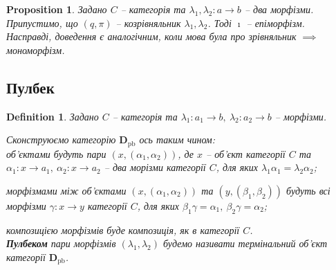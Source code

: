 \documentclass[a4paper, 10pt]{article}
\theoremstyle{theoremdd}
\newtheorem{definition}[theorem]{Definition}
\newtheorem{proposition}[theorem]{Proposition}
\begin{document}

\begin{proposition}
Задано $C$ -- категорія та $\lambda_1, \lambda_2 \colon a \to b$ -- два морфізми. Припустимо, що $(q,\pi)$ -- козрівняльник $\lambda_1,\lambda_2$. Тоді $\imath$ -- епіморфізм.\\
\textit{Насправді, доведення є аналогічним, коли мова була про зрівняльник $\implies$ мономорфізм.}
\end{proposition}

\subsection{Пулбек}
\begin{definition}
Задано $C$ -- категорія та $\lambda_1 \colon a_1 \to b,\ \lambda_2 \colon a_2 \to b$ -- морфізми.
\begin{figure}[H]
\centering
{}
\end{figure}
\noindent
Сконструюємо категорію $\textbf{D}_{\text{pb}}$ ось таким чином:\\
об'єктами будуть пари $(x,(\alpha_1,\alpha_2))$, де $x$ -- об'єкт категорії $C$ та $\alpha_1 \colon x \to a_1,\ \alpha_2 \colon x \to a_2$ -- два морізми категорії $C$, для яких $\lambda_1 \alpha_1 = \lambda_2 \alpha_2$;
\begin{figure}[H]
\centering
{}
\end{figure}
\noindent
морфізмами між об'єктами $(x,(\alpha_1,\alpha_2))$ та $(y,(\beta_1,\beta_2))$ будуть всі морфізми $\gamma \colon x \to y$ категорії $C$, для яких $\beta_1 \gamma = \alpha_1,\ \beta_2 \gamma = \alpha_2$;
\begin{figure}[H]
\centering
{}
\end{figure}
\noindent
композицією морфізмів буде композиція, як в категорії $C$.\\
\textbf{Пулбеком} пари морфізмів $(\lambda_1,\lambda_2)$ будемо називати термінальний об'єкт категорії $\textbf{D}_{\text{pb}}$.
\end{definition}
\end{document}
